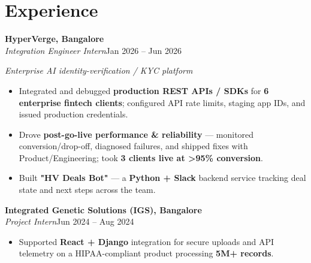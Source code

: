 \documentclass[10pt,a4paper]{article}
\begin{document}
\section*{Experience}
\vspace{1pt}\textbf{HyperVerge, Bangalore}\\
\textit{Integration Engineer Intern}\hfill Jan 2026 -- Jun 2026\par\vspace{1pt}
{\small\itshape Enterprise AI identity-verification / KYC platform}\par\vspace{1pt}
\begin{itemize}
\item Integrated and debugged \textbf{production REST APIs / SDKs} for \textbf{6 enterprise fintech clients}; configured API rate limits, staging app IDs, and issued production credentials.
\item Drove \textbf{post-go-live performance \& reliability} --- monitored conversion/drop-off, diagnosed failures, and shipped fixes with Product/Engineering; took \textbf{3 clients live at \textgreater{}95\% conversion}.
\item Built \textbf{"HV Deals Bot"} --- a \textbf{Python + Slack} backend service tracking deal state and next steps across the team.
\end{itemize}
\vspace{1pt}\textbf{Integrated Genetic Solutions (IGS), Bangalore}\\
\textit{Project Intern}\hfill Jun 2024 -- Aug 2024\par\vspace{1pt}
\begin{itemize}
\item Supported \textbf{React + Django} integration for secure uploads and API telemetry on a HIPAA-compliant product processing \textbf{5M+ records}.
\end{itemize}
\end{document}
